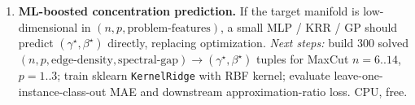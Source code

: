 \begin{enumerate}
\item \textbf{ML-boosted concentration prediction.} If the target manifold
is low-dimensional in $(n,p,\text{problem-features})$, a small MLP / KRR /
GP should predict $(\gamma^{\star},\beta^{\star})$ directly, replacing
optimization. \emph{Next steps:} build 300 solved
$(n,p,\text{edge-density},\text{spectral-gap})\!\to\!(\gamma^{\star},\beta^{\star})$
tuples for MaxCut $n=6..14$, $p=1..3$; train sklearn \texttt{KernelRidge}
with RBF kernel; evaluate leave-one-instance-class-out MAE and downstream
approximation-ratio loss. CPU, free.
\end{enumerate}

